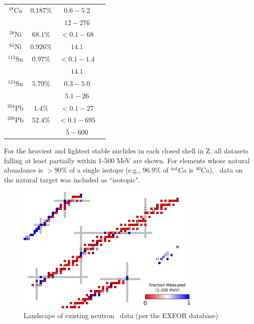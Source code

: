 \begin{eqation}
\begin{table}[ht]
\begin{center}
\begin{tabular}{ c c c c }
            $^{48}$Ca & $0.187\%$ & $0.6-5.2$ & \cite{Harvey1985}\\
            & & $12-276$ & \cite{Shane2010}\\

            $^{58}$Ni & $68.1\%$ & $<0.1-68$ & \cite{Perey1993}\\

            $^{64}$Ni & $0.926\%$ & $14.1$ & \cite{Dukarevich1967}\\

            $^{112}$Sn & $0.97\%$ & $<0.1-1.4$ & \cite{Timokhov1989}\\
            & & $14.1$ & \cite{Dukarevich1967}\\

            $^{124}$Sn & $5.79\%$ & $0.3-5.0$ & \cite{Harper1982}\\
            & & $5.1-26$ & \cite{Rapaport1980}\\

            $^{204}$Pb & $1.4\%$ & $<0.1-27$ & \cite{Carlton2003}\\

            $^{208}$Pb & $52.4\%$ & $<0.1 - 695$ & \cite{Harvey1999}\\
            & & $5-600$ & \cite{Finlay1993}\\

            \hline
        \end{tabular}
    \end{center}
\end{table}

 For the
    heaviest and lightest stable nuclides in each closed shell in Z, all
    datasets falling at least partially within 1-500 MeV are shown. For elements
    whose natural abundance is $>$90\% of a single isotope (e.g.,
    96.9\% of $^{\text{nat}}$Ca is $^{40}$Ca), \tot\ data on the natural
    target was included as ``isotopic".

\begin{figure}
    \includegraphics[width=0.8\textwidth]{figures/TCSChart.png}
    \caption{Landscape of existing neutron \tot\ data (per the EXFOR database)}
    \label{TCSChart}
\end{figure}


\end{eqation}
